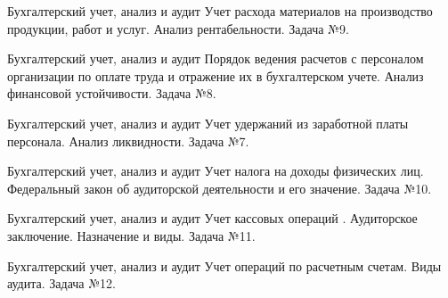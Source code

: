 \documentclass[
	11pt,
	a4paper,
	]
	{article}
\begin{document}
\begin{minipage}[t][\miniH]{\miniL}\centering
	 {Бухгалтерский учет, анализ и аудит}
		{
			Учет расхода материалов на производство продукции, работ и услуг.
		}{
			Анализ рентабельности.
		}{
			Задача №9.
		}
	\lowGE
\end{minipage}

\vfill



\begin{minipage}[t][\miniH]{\miniL}\centering
	 {Бухгалтерский учет, анализ и аудит}
		{
			Порядок ведения расчетов с персоналом организации по оплате труда и отражение их в бухгалтерском учете.
		}{
			Анализ финансовой устойчивости.
		}{
			Задача №8.
		}
	\lowGE
\end{minipage}

\vfill



\begin{minipage}[t][\miniH]{\miniL}\centering
	 {Бухгалтерский учет, анализ и аудит}
		{
			Учет удержаний из заработной платы персонала.
		}{
			Анализ ликвидности.
		}{
			Задача №7.
		}
	\lowGE
\end{minipage}





\begin{minipage}[t][\miniH]{\miniL}\centering
	 {Бухгалтерский учет, анализ и аудит}
		{
			Учет налога на доходы физических лиц.
		}{
			Федеральный закон об аудиторской деятельности и его значение.
		}{
			Задача №10.
		}
	\lowGE
\end{minipage}

\vfill



\begin{minipage}[t][\miniH]{\miniL}\centering
	 {Бухгалтерский учет, анализ и аудит}
		{
			Учет кассовых операций .
		}{
			Аудиторское заключение. Назначение и виды.
		}{
			Задача №11.
		}
	\lowGE
\end{minipage}

\vfill



\begin{minipage}[t][\miniH]{\miniL}\centering
	 {Бухгалтерский учет, анализ и аудит}
		{
			Учет операций по расчетным счетам.
		}{
			Виды аудита.
		}{
			Задача №12.
		}
	\lowGE
\end{minipage}
\end{document}
